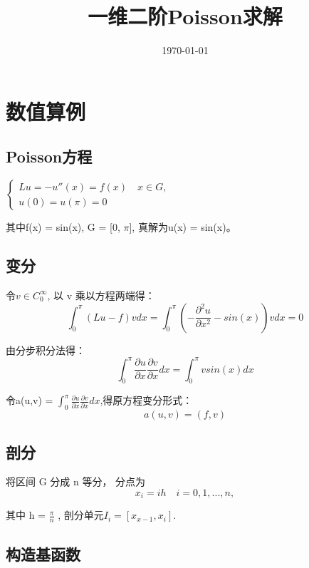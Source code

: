 \documentclass[UTF8,titlepage,twocolumn]{ctexart}
\title{一维二阶Poisson求解}
\date{\today}
\begin{document}
\maketitle	

\lstset{language=Python}



\section{数值算例}
\subsection{Poisson方程}
$
\begin{cases}
Lu = -u''(x) = f(x) \quad x \in G, \\
u(0)=u(\pi)=0
\end{cases}
$ \\
\par
其中f(x) = sin(x), G = [0, $\pi$], 真解为u(x) = sin(x)。
\subsection{变分}

令$v \in C_0^\infty $, 以 v 乘以方程两端得：
$$
\int_0^\pi (Lu - f) v dx = \int_0^\pi (- \frac{\partial^2 u}{\partial x^2} - sin(x)) v dx = 0
$$
\par
由分步积分法得：
$$
\int_0^\pi \frac{\partial u}{\partial x} \frac{\partial v}{\partial x} dx = \int_0^\pi v sin(x) dx
$$
\par 
令a(u,v) = $\int_0^\pi \frac{\partial u}{\partial x} \frac{\partial v}{\partial x} dx$,得原方程变分形式：
$$
a(u,v) = (f,v)
$$

\subsection{剖分}

将区间 G 分成 n 等分， 分点为
$$
x_i = ih \quad i = 0,1,...,n,
$$
\par 
其中 h = $\frac{\pi}{n}$ , 剖分单元$I_i = [x_{x-1}, x_i] $.

\subsection{构造基函数}
\end{document}
